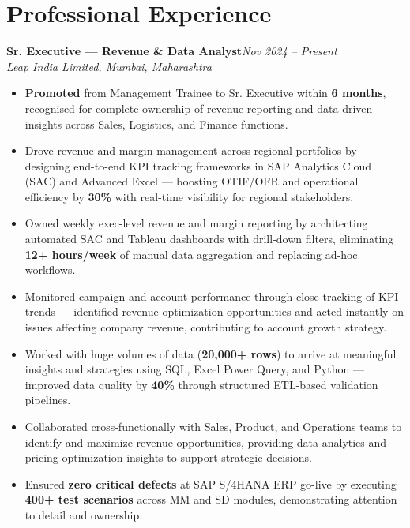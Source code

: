 \documentclass[10pt, letterpaper]{article}
\newcommand{\role}[3]{%
  \vspace{2pt}%
  {\bfseries #1}\hfill{\small\color{muted}\textit{#3}}\\[-2pt]%
  {\small\color{muted}\textit{#2}}%
}
\begin{document}
\section{Professional Experience}

\role{Sr. Executive — Revenue \& Data Analyst}{Leap India Limited, Mumbai, Maharashtra}{Nov 2024 – Present}

\begin{itemize}
  \item \textbf{Promoted} from Management Trainee to Sr. Executive within \textbf{6 months}, recognised for complete ownership of revenue reporting and data-driven insights across Sales, Logistics, and Finance functions.
  \item Drove revenue and margin management across regional portfolios by designing end-to-end KPI tracking frameworks in SAP Analytics Cloud (SAC) and Advanced Excel — boosting OTIF/OFR and operational efficiency by \textbf{30\%} with real-time visibility for regional stakeholders.
  \item Owned weekly exec-level revenue and margin reporting by architecting automated SAC and Tableau dashboards with drill-down filters, eliminating \textbf{12+ hours/week} of manual data aggregation and replacing ad-hoc workflows.
  \item Monitored campaign and account performance through close tracking of KPI trends — identified revenue optimization opportunities and acted instantly on issues affecting company revenue, contributing to account growth strategy.
  \item Worked with huge volumes of data (\textbf{20,000+ rows}) to arrive at meaningful insights and strategies using SQL, Excel Power Query, and Python — improved data quality by \textbf{40\%} through structured ETL-based validation pipelines.
  \item Collaborated cross-functionally with Sales, Product, and Operations teams to identify and maximize revenue opportunities, providing data analytics and pricing optimization insights to support strategic decisions.
  \item Ensured \textbf{zero critical defects} at SAP S/4HANA ERP go-live by executing \textbf{400+ test scenarios} across MM and SD modules, demonstrating attention to detail and ownership.
\end{itemize}

\vspace{1pt}
\end{document}

